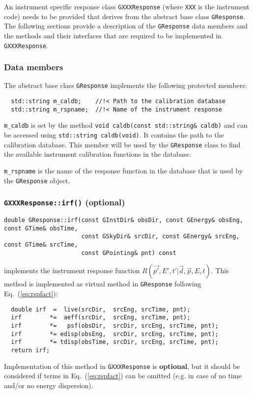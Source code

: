 \documentclass{article}[12pt,a4]
\begin{document}

An instrument specific response class {\tt GXXXResponse} (where {\tt XXX} is the instrument code)
needs to be provided that derives from the abstract base class {\tt GResponse}.
The following sections provide a description of the {\tt GResponse} data members and the
methods and their interfaces that are required to be implemented in {\tt GXXXResponse}.


\subsubsection{Data members}

The abstract base class {\tt GResponse} implements the following protected members:

\begin{verbatim}
  std::string m_caldb;    //!< Path to the calibration database
  std::string m_rspname;  //!< Name of the instrument response
\end{verbatim}

{\tt m\_caldb} is set by the method {\tt void caldb(const std::string\& caldb)} and can be
accessed using {\tt std::string caldb(void)}.
It contains the path to the calibration database.
This member will be used by the {\tt GResponse} class to find the available instrument
calibration functions in the database.

{\tt m\_rspname} is the name of the response function in the database that is used by the
{\tt GResponse} object.


\subsubsection{{\tt GXXXResponse::irf()} (optional)}
\label{sec:GXXXResponse::irf}

\begin{verbatim}
double GResponse::irf(const GInstDir& obsDir, const GEnergy& obsEng, const GTime& obsTime,
                      const GSkyDir& srcDir, const GEnergy& srcEng, const GTime& srcTime,
                      const GPointing& pnt) const
\end{verbatim}
implements the instrument response function $R(\vec{p'}, E', t' | \vec{d}, \vec{p}, E, t)$.
This method is implemented as virtual method in {\tt GResponse} following
Eq.~(\ref{eq:rspfact}):
\begin{verbatim}
  double irf  =  live(srcDir,  srcEng, srcTime, pnt);
  irf        *=  aeff(srcDir,  srcEng, srcTime, pnt);
  irf        *=   psf(obsDir,  srcDir, srcEng, srcTime, pnt);
  irf        *= edisp(obsEng,  srcDir, srcEng, srcTime, pnt);
  irf        *= tdisp(obsTime, srcDir, srcEng, srcTime, pnt);
  return irf;
\end{verbatim}
Implementation of this method in {\tt GXXXResponse} is {\bf optional}, but it should
be considered if terms in Eq.~(\ref{eq:rspfact}) can be omitted (e.g. in case of no time
and/or no energy dispersion).
\end{document}
